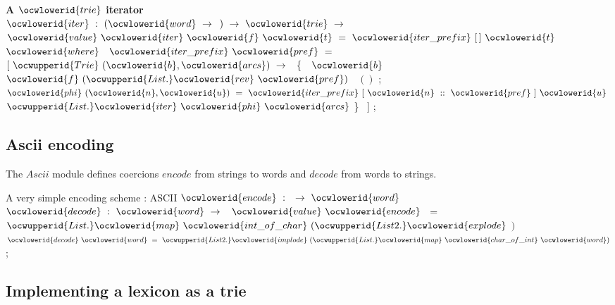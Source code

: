 \documentclass[12pt]{article}
\begin{document}
\ocwendcode{}\ocwindent{0.00em}
{\bf A \ocwbegindcode{}$\ocwlowerid{trie}$\ocwenddcode{} iterator}\\ 
\ocweol
\ocwindent{0.00em}
\ocwbegindcode{}$\ocwlowerid{iter}~:~(\ocwlowerid{word}~\rightarrow{}~$$)~\rightarrow{}~\ocwlowerid{trie}~\rightarrow{}~$\ocwenddcode{} 
\ocweol
\label{../ML/trie.ml:5870}%
\medskip
\ocwbegincode{}\ocwindent{0.00em}
$\ocwlowerid{value}~\ocwlowerid{iter}~\ocwlowerid{f}~\ocwlowerid{t}~=~\ocwlowerid{iter\_prefix}~[\,]~\ocwlowerid{t}$\ocweol
\ocwindent{1.00em}
$\ocwlowerid{where}~$~$\ocwlowerid{iter\_prefix}~\ocwlowerid{pref}~=~$\ocweol
\ocwindent{2.00em}
$[~\ocwupperid{Trie}~(\ocwlowerid{b},\ocwlowerid{arcs})~\rightarrow{}~$\ocweol
\ocwindent{3.50em}
\{~~$\ocwlowerid{b}~$~$\ocwlowerid{f}~(\ocwupperid{List.}\ocwlowerid{rev}~\ocwlowerid{pref})~$~$()$\ocweol
\ocwindent{3.50em}
;~~$\ocwlowerid{phi}~(\ocwlowerid{n},\ocwlowerid{u})~=~\ocwlowerid{iter\_prefix}~[~\ocwlowerid{n}~::~\ocwlowerid{pref}~]~\ocwlowerid{u}~$\ocweol
\ocwindent{4.50em}
$\ocwupperid{List.}\ocwlowerid{iter}~\ocwlowerid{phi}~\ocwlowerid{arcs}$\ocweol
\ocwindent{3.50em}
\}~\ocweol
\ocwindent{2.00em}
$]$\ocweol
\ocwindent{0.00em}
;\ocweol
\ocwendcode{}\subsection{Ascii encoding}

The $Ascii$ module defines coercions 
$encode$ from strings to words 
and $decode$ from words to strings.

\label{../ML/ascii.ml:0}%
A very simple encoding scheme : ASCII 
\ocweol
\ocwindent{0.00em}
\ocwbegindcode{}$\ocwlowerid{encode}~:~$~$\rightarrow{}~\ocwlowerid{word}$\ocwenddcode{} 
\ocweol
\ocwindent{0.00em}
\ocwbegindcode{}$\ocwlowerid{decode}~:~\ocwlowerid{word}~\rightarrow{}~$\ocwenddcode{} 
\ocweol
\label{../ML/ascii.ml:757}%
\medskip
\ocwbegincode{}\ocwindent{0.00em}
$\ocwlowerid{value}~\ocwlowerid{encode}~$~=~$\ocwupperid{List.}\ocwlowerid{map}~\ocwlowerid{int\_of\_char}~(\ocwupperid{List2.}\ocwlowerid{explode}~$$)$\ocweol
\ocwindent{0.00em}
~$\ocwlowerid{decode}~\ocwlowerid{word}~=~\ocwupperid{List2.}\ocwlowerid{implode}~(\ocwupperid{List.}\ocwlowerid{map}~\ocwlowerid{char\_of\_int}~\ocwlowerid{word})$\ocweol
\ocwindent{0.00em}
;\ocweol
\ocwendcode{}\subsection{Implementing a lexicon as a trie}
\end{document}
